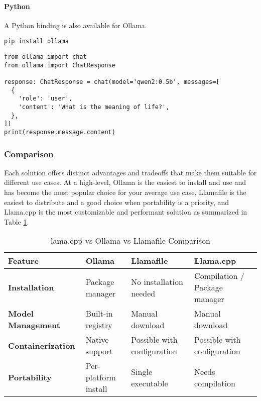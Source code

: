 \paragraph{Python}

A Python binding is also available for Ollama.

\begin{verbatim}
pip install ollama
\end{verbatim}

\begin{verbatim}
from ollama import chat
from ollama import ChatResponse

response: ChatResponse = chat(model='qwen2:0.5b', messages=[
  {
    'role': 'user',
    'content': 'What is the meaning of life?',
  },
])
print(response.message.content)
\end{verbatim}

\subsubsection{Comparison}

Each solution offers distinct advantages and tradeoffs that make them suitable for different use cases. At a high-level, Ollama is the easiest to install and use and has become the most popular choice for your average use case, Llamafile is the easiest to distribute and a good choice when portability is a priority, and Llama.cpp is the most customizable and performant solution as summarized in Table \ref{tab:feature-comparison-local}.

\begin{table}[H]
\centering
\caption{lama.cpp vs Ollama vs Llamafile Comparison}
\label{tab:feature-comparison-local}
\begin{tabular}{llll}
\toprule
Feature & Ollama & Llamafile & Llama.cpp \\
\midrule
\textbf{Installation} & Package manager & No installation needed & Compilation / Package manager \\
\textbf{Model Management} & Built-in registry & Manual download & Manual download \\
\textbf{Containerization} & Native support & Possible with configuration & Possible with configuration \\
\textbf{Portability} & Per-platform install & Single executable & Needs compilation \\
\bottomrule
\end{tabular}
\end{table}

